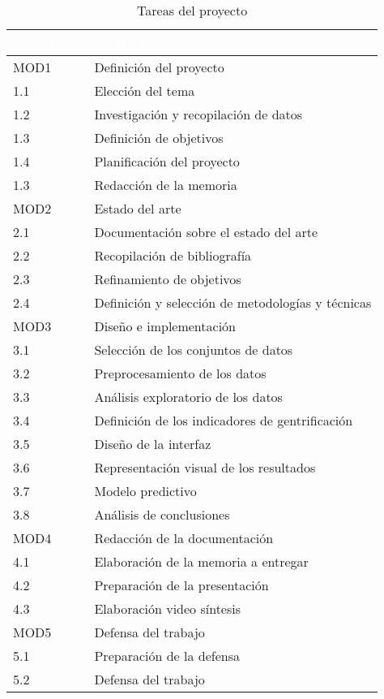 \documentclass[12pt,a4paper,twoside]{book}
\begin{document}
\begin{table}[H]
    \centering
    \begin{tabular}{m{6em}m{25em}}
       \hline
       \rowcolor[HTML]{004AAD}
       \textcolor{white}{\textbf{MÓDULO}} & \textcolor{white}{\textbf{TAREA}} \\
       \hline
       \rowcolor[HTML]{FF914D}
       MOD1 & Definición del proyecto \\
       \hline
         1.1 & Elección del tema \\
         1.2 & Investigación y recopilación de datos \\
         1.3 & Definición de objetivos \\
         1.4 & Planificación del proyecto \\
         1.3 & Redacción de la memoria \\
       \hline
       \rowcolor[HTML]{FF914D}
       MOD2 & Estado del arte \\
       \hline
         2.1 & Documentación sobre el estado del arte \\
         2.2 & Recopilación de bibliografía \\
         2.3 & Refinamiento de objetivos \\
         2.4 & Definición y selección de metodologías y técnicas \\
       \hline
       \rowcolor[HTML]{FF914D}
       MOD3 & Diseño e implementación \\
       \hline
         3.1 & Selección de los conjuntos de datos \\
         3.2 & Preprocesamiento de los datos \\
         3.3 & Análisis exploratorio de los datos \\
         3.4 & Definición de los indicadores de gentrificación \\
         3.5 & Diseño de la interfaz \\
         3.6 & Representación visual de los resultados \\
         3.7 & Modelo predictivo \\
         3.8 & Análisis de conclusiones \\
       \hline
       \rowcolor[HTML]{FF914D}
       MOD4 & Redacción de la documentación \\
       \hline
         4.1 & Elaboración de la memoria a entregar \\
         4.2 & Preparación de la presentación \\
         4.3 & Elaboración video síntesis \\
       \hline
       \rowcolor[HTML]{FF914D}
       MOD5 & Defensa del trabajo \\
       \hline
         5.1 & Preparación de la defensa \\
         5.2 & Defensa del trabajo \\
       \hline
    \end{tabular}
    \caption{Tareas del proyecto}
    \label{tab:tab_tareas}
\end{table}
\end{document}
